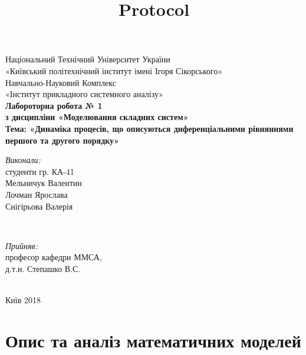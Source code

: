\documentclass[11pt]{article}
\title{Protocol}
\begin{document}
    
\begin{titlepage} 
\center

{\large
Національний Технічний Університет України\\[0.2cm]
«Київський політехнічний інститут імені Ігоря Сікорського»\\[0.2cm]
Навчально-Науковий Комплекс \\[0.2cm]
«Інститут прикладного системного аналізу»
}\\[4cm] %


{ \LARGE \bfseries
Лабороторна робота № 1 \\[0.4cm]
з дисципліни «Моделювання складних систем»\\[0.4cm]
Тема: «Динаміка процесів, що описуються диференціальними рівняннями першого та другого порядку»
}\\[5cm] %

\begin{minipage}{0.4\textwidth}
\begin{flushleft} \large
\emph{Виконали:} \\
студенти гр. КА-41 \\
Мельничук Валентин \\
Лочман Ярослава  \\
Снігірьова Валерія
\end{flushleft}
\end{minipage}
~
\begin{minipage}{0.4\textwidth}
\begin{flushright} \large
\emph{Прийняв:} \\
професор кафедри ММСА, \\
д.т.н. Степашко В.С. \\
\end{flushright}
\end{minipage}\\[5cm]

Київ 2018

\vfill %

\end{titlepage}

    
    

    
    \section{Опис та аналіз математичних
моделей}\label{ux43eux43fux438ux441-ux442ux430-ux430ux43dux430ux43bux456ux437-ux43cux430ux442ux435ux43cux430ux442ux438ux447ux43dux438ux445-ux43cux43eux434ux435ux43bux435ux439}
\end{document}

